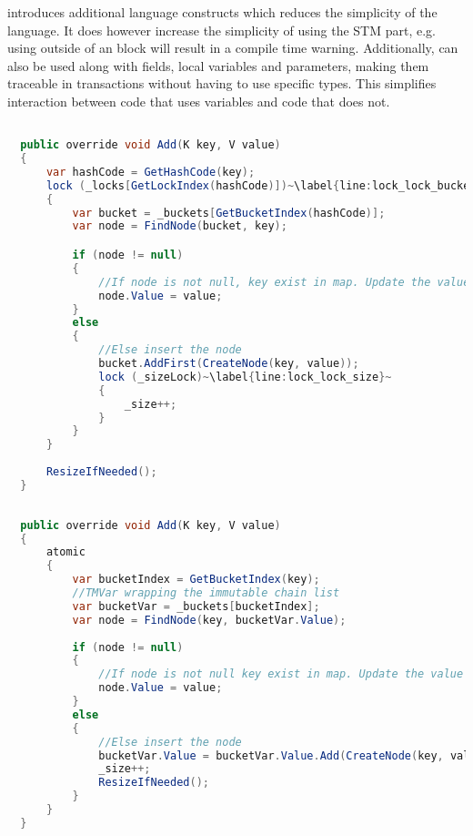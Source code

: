 \stmnamesp introduces additional language constructs which reduces the simplicity of the language. It does however increase the simplicity of using the \ac{STM} part, e.g. using  outside of an  block will result in a compile time warning. Additionally,  can also be used along with fields, local variables and parameters, making them traceable in transactions without having to use specific types. This simplifies interaction between code that uses  variables and code that does not. 

\begin{lstlisting}[float,label=lst:lock_add_hashmap,
  caption={ConcurrentHashMap \bscode{Add} Method - Locking},
  language=Java,  
  showspaces=false,
  showtabs=false,
  breaklines=true,
  showstringspaces=false,
  breakatwhitespace=true,
  escapechar=~,
  commentstyle=\color{greencomments},
  keywordstyle=\color{bluekeywords},
  stringstyle=\color{redstrings},
  morekeywords={atomic, retry, orelse, var, get, set, ref, out}]  % Start your code-block

  public override void Add(K key, V value)
  {
      var hashCode = GetHashCode(key);
      lock (_locks[GetLockIndex(hashCode)])~\label{line:lock_lock_bucket}~
      {
          var bucket = _buckets[GetBucketIndex(hashCode)];
          var node = FindNode(bucket, key);

          if (node != null)
          {
              //If node is not null, key exist in map. Update the value
              node.Value = value;
          }
          else
          {
              //Else insert the node
              bucket.AddFirst(CreateNode(key, value));
              lock (_sizeLock)~\label{line:lock_lock_size}~
              {
                  _size++;
              }
          }
      }
      
      ResizeIfNeeded();
  }
\end{lstlisting}

\begin{lstlisting}[float,label=lst:lang_add_hashmap,
  caption={ConcurrentHashMap \bscode{Add} Method - \stmname},
  language=Java,  
  showspaces=false,
  showtabs=false,
  breaklines=true,
  showstringspaces=false,
  breakatwhitespace=true,
  escapechar=~,
  commentstyle=\color{greencomments},
  keywordstyle=\color{bluekeywords},
  stringstyle=\color{redstrings},
  morekeywords={atomic, retry, orelse, var, get, set, ref, out}]  % Start your code-block
  
  public override void Add(K key, V value)
  {
      atomic
      {
          var bucketIndex = GetBucketIndex(key);
          //TMVar wrapping the immutable chain list
          var bucketVar = _buckets[bucketIndex];
          var node = FindNode(key, bucketVar.Value);
         
          if (node != null)
          {
              //If node is not null key exist in map. Update the value
              node.Value = value;
          }
          else
          {
              //Else insert the node
              bucketVar.Value = bucketVar.Value.Add(CreateNode(key, value));
              _size++;
              ResizeIfNeeded();
          }
      }
  }
\end{lstlisting}

